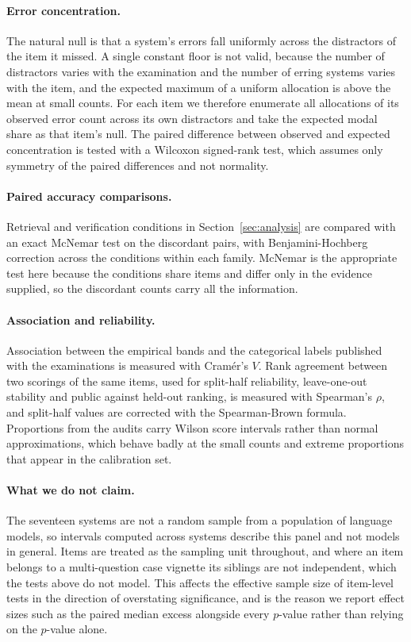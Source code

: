 \paragraph{Error concentration.}
The natural null is that a system's errors fall uniformly across the distractors of the item it
missed. A single constant floor is not valid, because the number of distractors varies with the
examination and the number of erring systems varies with the item, and the expected maximum of a
uniform allocation is above the mean at small counts. For each item we therefore enumerate all
allocations of its observed error count across its own distractors and take the expected modal
share as that item's null. The paired difference between observed and expected concentration is
tested with a Wilcoxon signed-rank test, which assumes only symmetry of the paired differences
and not normality.

\paragraph{Paired accuracy comparisons.}
Retrieval and verification conditions in Section~\ref{sec:analysis} are compared with an exact McNemar
test on the discordant pairs, with Benjamini-Hochberg correction across the conditions within each
family. McNemar is the appropriate test here because the conditions share items and differ only in the
evidence supplied, so the discordant counts carry all the information.

\paragraph{Association and reliability.}
Association between the empirical bands and the categorical labels published with the
examinations is measured with Cram\'er's $V$. Rank agreement between two scorings of the same
items, used for split-half reliability, leave-one-out stability and public against held-out
ranking, is measured with Spearman's $\rho$, and split-half values are corrected with the
Spearman-Brown formula. Proportions from the audits carry Wilson score intervals rather than
normal approximations, which behave badly at the small counts and extreme proportions that
appear in the calibration set.

\paragraph{What we do not claim.}
The seventeen systems are not a random sample from a population of language models, so intervals
computed across systems describe this panel and not models in general. Items are treated as the
sampling unit throughout, and where an item belongs to a multi-question case vignette its
siblings are not independent, which the tests above do not model. This affects the effective
sample size of item-level tests in the direction of overstating significance, and is the reason
we report effect sizes such as the paired median excess alongside every $p$-value rather than
relying on the $p$-value alone.

